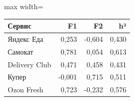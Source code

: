 {%
\small
\setlength{\tabcolsep}{3.0pt}
\renewcommand{\arraystretch}{1.12}
\begin{adjustbox}{max width=\textwidth}
\begin{tabular}{lrrr}
\toprule
Сервис & F1 & F2 & h² \\
\midrule
Яндекс Еда & 0,253 & -0,604 & 0,430 \\
Самокат & 0,781 & 0,054 & 0,613 \\
Delivery Club & 0,471 & 0,458 & 0,431 \\
Купер & -0,001 & 0,715 & 0,511 \\
Ozon Fresh & 0,723 & -0,232 & 0,576 \\
\bottomrule
\end{tabular}
\end{adjustbox}
}